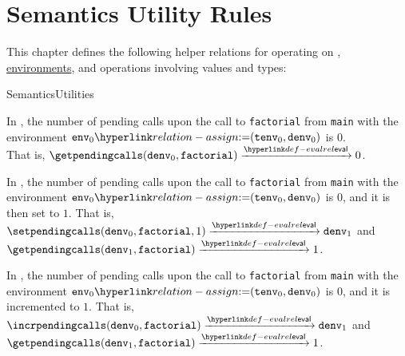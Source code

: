 \chapter{Semantics Utility Rules\label{chap:SemanticsUtilityRules}}

This chapter defines the following helper relations for operating on \nativevaluesterm{},
\hyperlink{def-envs}{environments}, and operations involving values and types:
\begin{SemanticsRuleList}{SemanticsUtilities}


In , the number of pending calls upon the call to \verb|factorial| from \verb|main|
with the environment $\env_0 \eqdef (\tenv_0, \denv_0)$ is $0$.\\
That is, $\getpendingcalls(\denv_0, \factorial) \evalarrow 0$.



In , the number of pending calls upon the call to \verb|factorial| from \verb|main|
with the environment $\env_0 \eqdef (\tenv_0, \denv_0)$ is $0$, and it is then set to $1$.
That is, \\
$\setpendingcalls(\denv_0, \factorial, 1) \evalarrow \denv_1$
and\\
$\getpendingcalls(\denv_1, \factorial) \evalarrow 1$.



In , the number of pending calls upon the call to \verb|factorial| from \verb|main|
with the environment $\env_0 \eqdef (\tenv_0, \denv_0)$ is $0$, and it is incremented to $1$.
That is, \\
$\incrpendingcalls(\denv_0, \factorial) \evalarrow \denv_1$
and\\
$\getpendingcalls(\denv_1, \factorial) \evalarrow 1$.


\end{SemanticsRuleList}
